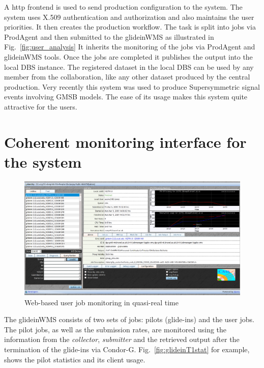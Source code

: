 \documentclass[a4paper]{jpconf}
\begin{document}
A http frontend is used to send production configuration to the system. 
The system uses X.509 authentication and authorization and also maintains the user priorities. 
It then creates the production workflow. The task is split into jobs via ProdAgent and then 
submitted to the glideinWMS as illustrated in Fig.~\ref{fig:user_analysis} It inherits the monitoring of the 
jobs via ProdAgent and glideinWMS tools. 
Once the jobs are completed it publishes the output into the local DBS instance. The registered 
dataset in the local DBS can be used by any member from the collaboration, like any other dataset produced 
by the central production. Very recently this system was used to produce Supersymmetric signal
events involving GMSB models. The ease of its usage makes this system quite attractive
for the users.
\section{Coherent monitoring interface for the system}
\begin{figure}
\begin{center}
\includegraphics[scale=0.4]{jobMon.png}
\end{center}
\caption{Web-based user job monitoring in quasi-real time}
\label{fig:jobMon}
\end{figure}
The glideinWMS consists of two sets of jobs: pilots (glide-ins) and the user jobs. The
pilot jobs, as well as the submission rates, are monitored using the information from the \emph{collector},
\emph{submitter} and the retrieved output after the termination of the glide-ins via Condor-G.
Fig.~\ref{fig:glideinT1stat} for example, shows the pilot statistics and its client usage.
\end{document}
